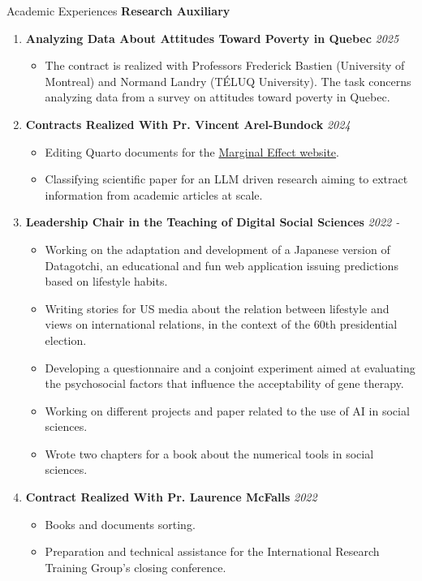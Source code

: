 \documentclass{resume} %
\begin{document}
\begin{rSection}{Academic Experiences}
{\bf Research Auxiliary}
\begin{enumerate}
    \item \textbf{Analyzing Data About Attitudes Toward Poverty in Quebec} \hfill {\em 2025}
        \begin{itemize}
            \item The contract is realized with Professors Frederick Bastien (University of Montreal) and Normand Landry (TÉLUQ University). The task concerns analyzing data from a survey on attitudes toward poverty in Quebec.
        \end{itemize}
    \item \textbf{Contracts Realized With Pr. Vincent Arel-Bundock} \hfill {\em 2024}
        \begin{itemize}
          \item Editing Quarto documents for the \href{https://marginaleffects.com}{Marginal Effect website}.
            \item Classifying scientific paper for an LLM driven research aiming to extract information from academic articles at scale.
        \end{itemize}
    \item \textbf{Leadership Chair in the Teaching of Digital Social Sciences} \hfill {\em 2022 -}
        \begin{itemize}
            \item {Working on the adaptation and development of a Japanese version of Datagotchi, an educational and fun web application issuing predictions based on lifestyle habits.}
            \item Writing stories for US media about the relation between lifestyle and views on international relations, in the context of the 60th presidential election. 
            \item Developing a questionnaire and a conjoint experiment aimed at evaluating the psychosocial factors that influence the acceptability of gene therapy.
            \item Working on different projects and paper related to the use of AI in social sciences.
            \item Wrote two chapters for a book about the numerical tools in social sciences.
        \end{itemize}
    \item \textbf{Contract Realized With Pr. Laurence McFalls} \hfill {\em 2022}
        \begin{itemize}
            \item Books and documents sorting.
            \item Preparation and technical assistance for the International Research Training Group's closing conference.
        \end{itemize}
\end{enumerate}

\end{rSection}
\end{document}
